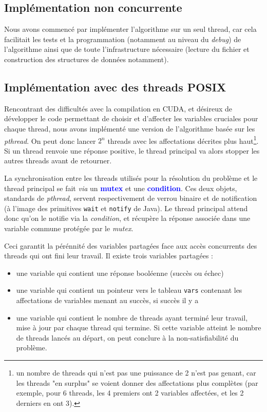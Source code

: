 \documentclass{article}
\newcommand{\keyword}[1]{\textbf{\textcolor{blue}{#1}}}
\newcommand{\code}[1]{\texttt{{#1}}}
\newcommand{\cuda}{\textsc{CUDA}}
\begin{document}
\subsection{Implémentation non concurrente}
    Nous avons commencé par implémenter l'algorithme sur un seul thread, car cela facilitait les tests et la programmation (notamment au niveau du \emph{debug}) de l'algorithme ainsi que de toute l'infrastructure nécessaire (lecture du fichier et construction des structures de données notamment). 

\subsection{Implémentation avec des threads \textsc{POSIX}}
Rencontrant des difficultés avec la compilation en \cuda, et désireux de développer le code permettant de choisir et d'affecter les variables \og cruciales \fg pour chaque thread, nous avons implémenté une version de l'algorithme basée sur les \emph{pthread}. On peut donc lancer $2^{n}$ threads avec les affectations décrites plus haut\footnote{un nombre de threads qui n'est pas une puissance de 2 n'est pas genant, car les threads "en surplus" se voient donner des affectations plus complètes (par exemple, pour 6 threads, les 4 premiers ont 2 variables affectées, et les 2 derniers en ont 3).}. Si un thread renvoie une réponse positive, le thread principal va alors stopper les autres threads avant de retourner.

La synchronisation entre les threads utilisés pour la résolution du problème et le thread principal se fait \emph{via} un \keyword{mutex} et une \keyword{condition}. Ces deux objets, standards de \emph{pthread}, servent respectivement de verrou binaire et de notification (à l'image des primitives \code{wait} et \code{notify} de Java). Le thread principal attend donc qu'on le notifie via la \emph{condition}, et récupère la réponse associée dans une variable commune protégée par le \emph{mutex}. 

Ceci garantit la pérénnité des variables partagées face aux accès concurrents des threads qui ont fini leur travail. Il existe trois variables partagées :
\begin{itemize}
      \item une variable qui contient une réponse booléenne (succès ou échec)
      \item une variable qui contient un pointeur vers le tableau \code{vars} contenant les affectations de variables menant au succès, si succès il y a
      \item une variable qui contient le nombre de threads ayant terminé leur travail, mise à jour par chaque thread qui termine. Si cette variable atteint le nombre de threads lancés au départ, on peut conclure à la non-satisfiabilité du problème.
\end{itemize}
\end{document}
